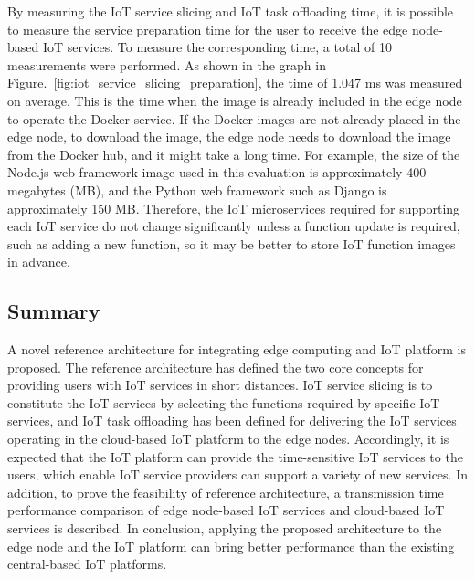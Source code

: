 By measuring the IoT service slicing and IoT task offloading time, it is possible to measure the service preparation time for the user to receive the edge node-based IoT services. 
To measure the corresponding time, a total of 10 measurements were performed. As shown in the graph in Figure.~\ref{fig:iot_service_slicing_preparation}, the time of 1.047 ms was measured on average. 
This is the time when the image is already included in the edge node to operate the Docker service. 
If the Docker images are not already placed in the edge node, to download the image, the edge node needs to download the image from the Docker hub, and it might take a long time. 
For example, the size of the Node.js web framework image used in this evaluation is approximately 400 megabytes (MB), and the Python web framework such as Django is approximately 150 MB. 
Therefore, the IoT microservices required for supporting each IoT service do not change significantly unless a function update is required, such as adding a new function, so it may be better to store IoT function images in advance.

\subsection{Summary}
A novel reference architecture for integrating edge computing and IoT platform is proposed. The reference architecture has defined the two core concepts for providing users with IoT services in short distances. IoT service slicing is to constitute the IoT services by selecting the functions required by specific IoT services, and IoT task offloading has been defined for delivering the IoT services operating in the cloud-based IoT platform to the edge nodes. Accordingly, it is expected that the IoT platform can provide the time-sensitive IoT services to the users, which enable IoT service providers can support a variety of new services. In addition, to prove the feasibility of reference architecture, a transmission time performance comparison of edge node-based IoT services and cloud-based IoT services is described. In conclusion, applying the proposed architecture to the edge node and the IoT platform can bring better performance than the existing central-based IoT platforms.
\clearpage